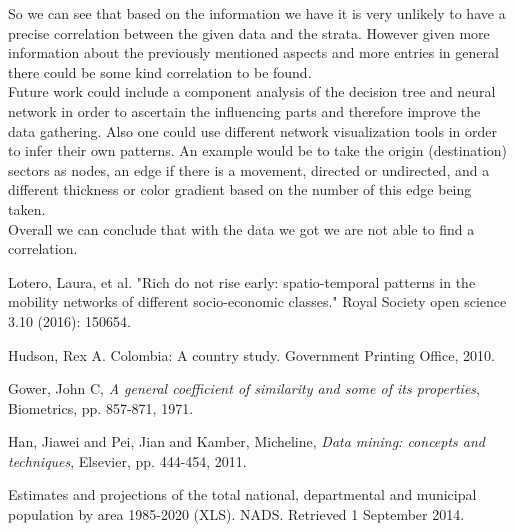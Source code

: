 \documentclass[runningheads]{llncs}
\begin{document}
	So we can see that based on the information we have it is very unlikely to have a precise correlation between the given data and the strata. However given more information about the previously mentioned aspects and more entries in general there could be some kind correlation to be found.\\
	Future work could include a component analysis of the decision tree and neural network in order to ascertain the influencing parts and therefore improve the data gathering. Also one could use different network visualization tools in order to infer their own patterns. An example would be to take the origin (destination) sectors as nodes, an edge if there is a movement, directed or undirected, and a different thickness or color gradient based on the number of this edge being taken.\\
	
	Overall we can conclude that with the data we got we are not able to find a correlation.
	
	
	\begin{thebibliography}{8}
		Lotero, Laura, et al. "Rich do not rise early: spatio-temporal patterns in the mobility networks of different socio-economic classes." Royal Society open science 3.10 (2016): 150654.
		
		Hudson, Rex A. Colombia: A country study. Government Printing Office, 2010.
		
		Gower, John C,
		\emph{A general coefficient of similarity and some of its properties},
		Biometrics, pp. 857-871,
		1971.
		
		Han, Jiawei and Pei, Jian and Kamber, Micheline,
		\emph{Data mining: concepts and techniques},
		Elsevier, pp. 444-454,
		2011.
		
		Estimates and projections of the total national, departmental and municipal population by area 1985-2020 (XLS). NADS. Retrieved 1 September 2014.
	\end{thebibliography}
\end{document}

